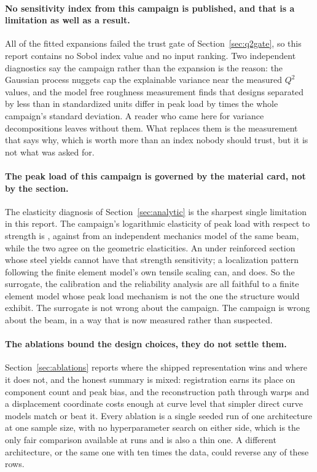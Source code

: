 \documentclass[11pt,a4paper]{article}
\begin{document}
\paragraph{No sensitivity index from this campaign is published, and that is a limitation as
well as a result.}
All \SensWithheld{} of the \SensTargets{} fitted expansions failed the trust gate of
Section~\ref{sec:q2gate}, so this report contains no Sobol index value and no input ranking.
Two independent diagnostics say the campaign rather than the expansion is the reason: the
Gaussian process nuggets cap the explainable variance near the measured $Q^2$ values, and the
model free roughness measurement finds that designs separated by less than
\SensRoughSeparation{} in standardized units differ in peak load by \SensRoughPMax{} times the
whole campaign's standard deviation. A reader who came here for variance decompositions leaves
without them. What replaces them is the measurement that says why, which is worth more than an
index nobody should trust, but it is not what was asked for.

\paragraph{The peak load of this campaign is governed by the material card, not by the
section.}
The elasticity diagnosis of Section~\ref{sec:analytic} is the sharpest single limitation in
this report. The campaign's logarithmic elasticity of peak load with respect to strength is
\CampaignElasticityFcm{}, against \AnalyticElasticityFcm{} from an independent mechanics model
of the same beam, while the two agree on the geometric elasticities. An under reinforced
section whose steel yields cannot have that strength sensitivity; a localization pattern
following the finite element model's own tensile scaling can, and does. So the surrogate,
the calibration and the reliability analysis are all faithful to a finite element model whose
peak load mechanism is not the one the structure would exhibit. The surrogate is not wrong
about the campaign. The campaign is wrong about the beam, in a way that is now measured rather
than suspected.

\paragraph{The ablations bound the design choices, they do not settle them.}
Section~\ref{sec:ablations} reports where the shipped representation wins and where it does
not, and the honest summary is mixed: registration earns its place on component count and peak
bias, and the reconstruction path through warps and a displacement coordinate costs enough at
curve level that simpler direct curve models match or beat it. Every ablation is a single seeded
run of one architecture at one sample size, with no hyperparameter search on either side, which
is the only fair comparison available at \NValid{} runs and is also a thin one. A different
architecture, or the same one with ten times the data, could reverse any of these rows.
\end{document}
